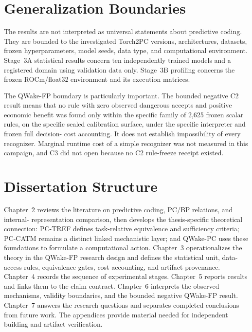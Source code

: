 

\section{Generalization Boundaries}
\label{sec:intro-scope-en}

The results are not interpreted as universal statements about predictive coding. They
are bounded to the investigated Torch2PC versions, architectures, datasets, frozen
hyperparameters, model seeds, data type, and computational environment. Stage~3A
statistical results concern ten independently trained models and a registered domain
using validation data only. Stage~3B profiling concerns the frozen ROCm/float32
environment and its execution matrices.

The QWake-FP boundary is particularly important. The bounded negative C2 result means
that no rule with zero observed dangerous accepts and positive economic benefit was
found only within the specific family of 2,625 frozen scalar rules, on the specific
sealed calibration surface, under the specific interpreter and frozen full decision-
cost accounting. It does not establish impossibility of every recognizer. Marginal
runtime cost of a simple recognizer was not measured in this campaign, and C3 did not
open because no C2 rule-freeze receipt existed.

\section{Dissertation Structure}

Chapter~2 reviews the literature on predictive coding, PC/BP relations, and internal-
representation comparison, then develops the thesis-specific theoretical connection:
PC-TREF defines task-relative equivalence and sufficiency criteria; PC-CATM remains a
distinct linked mechanistic layer; and QWake-PC uses these foundations to formulate a
computational action. Chapter~3 operationalizes the theory in the QWake-FP research
design and defines the statistical unit, data-access rules, equivalence gates, cost
accounting, and artifact provenance. Chapter~4 records the sequence of experimental
stages. Chapter~5 reports results and links them to the claim contract. Chapter~6
interprets the observed mechanisms, validity boundaries, and the bounded negative
QWake-FP result. Chapter~7 answers the research questions and separates completed
conclusions from future work. The appendices provide material needed for independent
building and artifact verification.
